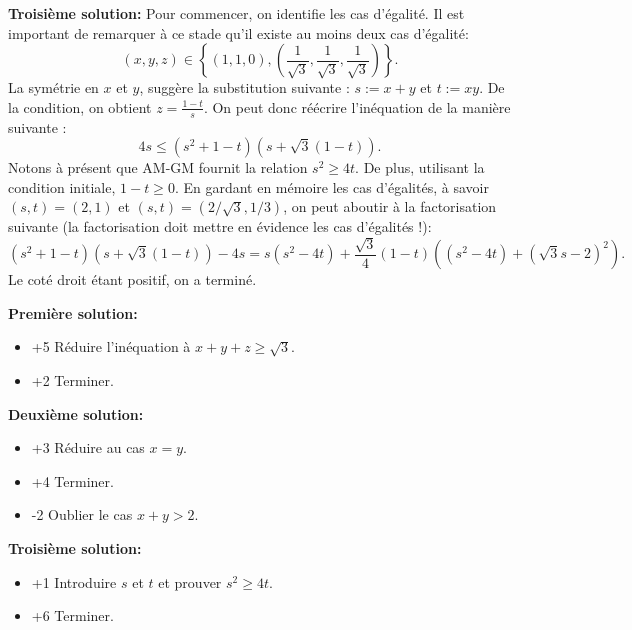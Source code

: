 \documentclass[language=german,style=solution]{smo}
\begin{document}
\begin{enumerate}[label=\textbf{\arabic*.}]
\textbf{Troisième solution:}
Pour commencer, on identifie les cas d'égalité. Il est important de remarquer à ce stade qu'il existe au moins deux cas d'égalité:
\[
(x,y,z)\in\left\{(1,1,0),\left(\frac{1}{\sqrt{3}},\frac{1}{\sqrt{3}},\frac{1}{\sqrt{3}}\right)\right\}.
\]
La symétrie en $x$ et $y$, suggère la substitution suivante : $s:=x+y$ et $t:=xy$. De la condition, on obtient $z=\frac{1-t}{s}$. On peut donc réécrire l'inéquation de la manière suivante :
\[
4s\leq (s^2+1-t)(s+\sqrt{3}(1-t)).
\]
Notons à présent que AM-GM fournit la relation $s^2\geq 4t$. De plus, utilisant la condition initiale, $1-t\geq 0$. En gardant en mémoire les cas d'égalités, à savoir $(s,t)=(2,1)$ et $(s,t)=(2/\sqrt{3},1/3)$, on peut aboutir à la factorisation suivante (la factorisation doit mettre en évidence les cas d'égalités !):
\[
(s^2+1-t)(s+\sqrt{3}(1-t))-4s=s(s^2-4t)+\frac{\sqrt{3}}{4}(1-t)\left((s^2-4t)+(\sqrt{3}s-2)^2\right).
\]
Le coté droit étant positif, on a terminé.

\textbf{Première solution:}
\begin{itemize}
	\item +5 Réduire l'inéquation à $x + y + z \geq \sqrt{3}$.
	\item +2 Terminer.
\end{itemize}
\textbf{Deuxième solution:}
\begin{itemize}
	\item +3 Réduire au cas $x = y$.
	\item +4 Terminer.
	\item -2 Oublier le cas $x + y > 2$.
\end{itemize}
\textbf{Troisième solution:}
\begin{itemize}
	\item +1 Introduire $s$ et $t$ et prouver $s^2 \geq 4t$.
	\item +6 Terminer.
\end{itemize}


\end{enumerate}

\bigskip

\vspace{1cm}
\end{document}
